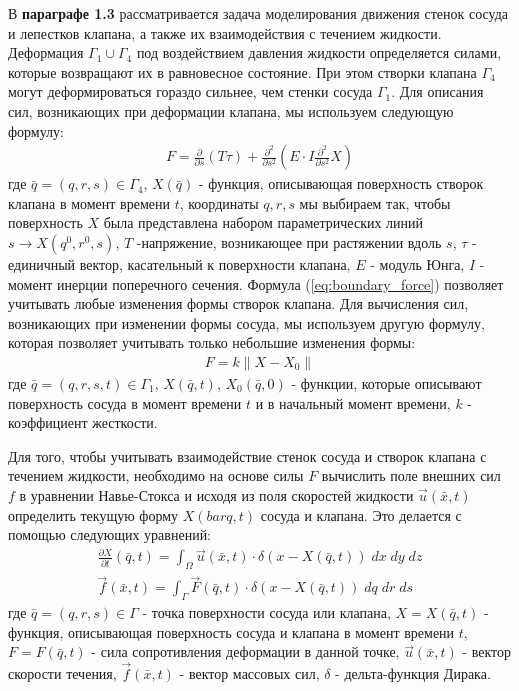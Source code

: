 В \textbf{параграфе 1.3} рассматривается задача моделирования движения стенок сосуда и лепестков клапана,
а также их взаимодействия с течением жидкости. Деформация $\Gamma_1 \cup \Gamma_4$ под воздействием давления жидкости
определяется силами, которые возвращают их в равновесное состояние. При этом створки клапана $\Gamma_4$ могут 
деформироваться гораздо сильнее, чем стенки сосуда $\Gamma_1$. Для описания сил, возникающих при деформации клапана,
мы используем следующую формулу:
\begin{gather}
    \label{eq:boundary_force}
    F = \frac{\partial}{\partial s} (T \tau) + \frac{\partial^2}{\partial s^2} (E \cdot I \frac{\partial^2}{\partial s^2} X)
\end{gather}
где $\bar{q}=(q, r, s) \in \Gamma_4$, $X(\bar{q})$ - функция, описывающая поверхность створок клапана в момент времени $t$,
координаты $q, r, s$ мы выбираем так, чтобы поверхность $X$ была представлена набором параметрических линий $s \rightarrow X(q^0, r^0, s)$,
$T$ -напряжение, возникающее при растяжении вдоль $s$, $\tau$ - единичный вектор, касательный к поверхности клапана, $E$ - модуль Юнга,
$I$ - момент инерции поперечного сечения. Формула (\ref{eq:boundary_force}) позволяет учитывать любые изменения формы створок клапана.  
Для вычисления сил, возникающих при изменении формы сосуда, мы используем другую формулу, которая позволяет учитывать только 
небольшие изменения формы:
\begin{gather}
    \label{eq:boundary_force_simple}
    F = k \|X - X_0\|
\end{gather}
где $\bar{q} = (q, r, s, t) \in \Gamma_1$, $X(\bar{q}, t)$, $X_0(\bar{q}, 0)$ - функции, которые описывают поверхность сосуда в момент времени $t$
и в начальный момент времени, $k$ - коэффициент жесткости.

Для того, чтобы учитывать взаимодействие стенок сосуда и створок клапана с течением жидкости, необходимо на основе силы $F$
вычислить поле внешних сил $f$ в уравнении Навье-Стокса и исходя из поля скоростей жидкости $\vec{u}(\bar{x}, t)$
определить текущую форму $X(bar{q}, t)$ сосуда и клапана. Это делается с помощью следующих уравнений:
\begin{gather}
    \label{eq:interaction:velocity}
    \frac{\partial X}{\partial t}(\bar{q}, t) = \int_{\Omega} \vec{u}(\bar{x}, t) \cdot \delta (x - X(\bar{q}, t))\; dx\; dy\; dz\\
    \label{eq:interaction:force}
    \vec{f}(\bar{x}, t) = \int_{\Gamma} \vec{F}(\bar{q}, t) \cdot \delta (x - X(\bar{q}, t))\; dq\; dr\; ds
\end{gather}
где $\bar{q} = (q, r, s) \in \Gamma$ - точка поверхности сосуда или клапана, $X = X(\bar{q}, t)$ - функция, описывающая поверхность сосуда и клапана
в момент времени $t$, $F = F(\bar{q}, t)$ - сила сопротивления деформации в данной точке,
$\vec{u}(\bar{x}, t)$ - вектор скорости течения, $\vec{f}(\bar{x}, t)$ - вектор массовых сил, $\delta$ - дельта-функция Дирака.

